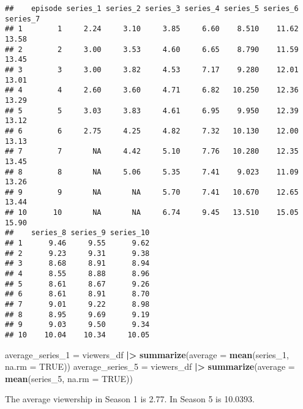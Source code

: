\documentclass[
]{article}
\newenvironment{Shaded}{\begin{snugshade}}{\end{snugshade}}
\newcommand{\AttributeTok}[1]{\textcolor[rgb]{0.13,0.29,0.53}{#1}}
\newcommand{\ConstantTok}[1]{\textcolor[rgb]{0.56,0.35,0.01}{#1}}
\newcommand{\FunctionTok}[1]{\textcolor[rgb]{0.13,0.29,0.53}{\textbf{#1}}}
\newcommand{\NormalTok}[1]{#1}
\newcommand{\OtherTok}[1]{\textcolor[rgb]{0.56,0.35,0.01}{#1}}
\newcommand{\SpecialCharTok}[1]{\textcolor[rgb]{0.81,0.36,0.00}{\textbf{#1}}}
\begin{document}
\begin{verbatim}
##    episode series_1 series_2 series_3 series_4 series_5 series_6 series_7
## 1        1     2.24     3.10     3.85     6.60    8.510    11.62    13.58
## 2        2     3.00     3.53     4.60     6.65    8.790    11.59    13.45
## 3        3     3.00     3.82     4.53     7.17    9.280    12.01    13.01
## 4        4     2.60     3.60     4.71     6.82   10.250    12.36    13.29
## 5        5     3.03     3.83     4.61     6.95    9.950    12.39    13.12
## 6        6     2.75     4.25     4.82     7.32   10.130    12.00    13.13
## 7        7       NA     4.42     5.10     7.76   10.280    12.35    13.45
## 8        8       NA     5.06     5.35     7.41    9.023    11.09    13.26
## 9        9       NA       NA     5.70     7.41   10.670    12.65    13.44
## 10      10       NA       NA     6.74     9.45   13.510    15.05    15.90
##    series_8 series_9 series_10
## 1      9.46     9.55      9.62
## 2      9.23     9.31      9.38
## 3      8.68     8.91      8.94
## 4      8.55     8.88      8.96
## 5      8.61     8.67      9.26
## 6      8.61     8.91      8.70
## 7      9.01     9.22      8.98
## 8      8.95     9.69      9.19
## 9      9.03     9.50      9.34
## 10    10.04    10.34     10.05
\end{verbatim}

\begin{Shaded}
\begin{Highlighting}[]
\NormalTok{average\_series\_1 }\OtherTok{=}\NormalTok{ viewers\_df }\SpecialCharTok{|\textgreater{}}
  \FunctionTok{summarize}\NormalTok{(}\AttributeTok{average =} \FunctionTok{mean}\NormalTok{(series\_1, }\AttributeTok{na.rm =} \ConstantTok{TRUE}\NormalTok{))}
\NormalTok{average\_series\_5 }\OtherTok{=}\NormalTok{ viewers\_df }\SpecialCharTok{|\textgreater{}}
  \FunctionTok{summarize}\NormalTok{(}\AttributeTok{average =} \FunctionTok{mean}\NormalTok{(series\_5, }\AttributeTok{na.rm =} \ConstantTok{TRUE}\NormalTok{))}
\end{Highlighting}
\end{Shaded}

The average viewership in Season 1 is 2.77. In Season 5 is 10.0393.
\end{document}
